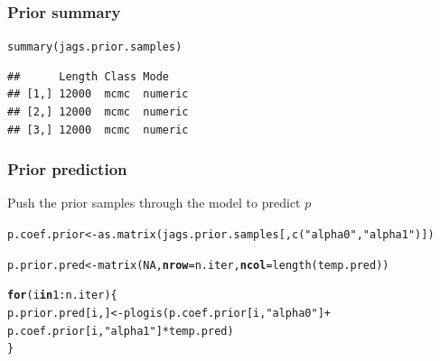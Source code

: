\documentclass[color=usenames,dvipsnames]{beamer}\usepackage[]{graphicx}\usepackage[]{xcolor}
\makeatletter
\newcommand{\hlnum}[1]{\textcolor[rgb]{0.69,0.494,0}{#1}}%
\newcommand{\hlsng}[1]{\textcolor[rgb]{0.749,0.012,0.012}{#1}}%
\newcommand{\hlopt}[1]{\textcolor[rgb]{0,0,0}{#1}}%
\newcommand{\hldef}[1]{\textcolor[rgb]{0,0,0}{#1}}%
\newcommand{\hlkwa}[1]{\textcolor[rgb]{0,0,0}{\textbf{#1}}}%
\newcommand{\hlkwb}[1]{\textcolor[rgb]{0,0.341,0.682}{#1}}%
\newcommand{\hlkwc}[1]{\textcolor[rgb]{0,0,0}{\textbf{#1}}}%
\newcommand{\hlkwd}[1]{\textcolor[rgb]{0.004,0.004,0.506}{#1}}%
\newenvironment{kframe}{%
 \def\at@end@of@kframe{}%
 \ifinner\ifhmode%
  \def\at@end@of@kframe{\end{minipage}}%
  \begin{minipage}{\columnwidth}%
 \fi\fi%
 \def\FrameCommand##1{\hskip\@totalleftmargin \hskip-\fboxsep
 \colorbox{shadecolor}{##1}\hskip-\fboxsep
     \hskip-\linewidth \hskip-\@totalleftmargin \hskip\columnwidth}%
 \MakeFramed {\advance\hsize-\width
   \@totalleftmargin\z@ \linewidth\hsize
   \@setminipage}}%
 {\par\unskip\endMakeFramed%
 \at@end@of@kframe}
\newenvironment{knitrout}{}{} %
\makeatother
\begin{document}
\begin{frame}[fragile]
  \frametitle{Prior summary}
\begin{knitrout}\tiny
{}\color{fgcolor}\begin{kframe}
\begin{alltt}
\hlkwd{summary}\hldef{(jags.prior.samples)}
\end{alltt}
\begin{verbatim}
##      Length Class Mode   
## [1,] 12000  mcmc  numeric
## [2,] 12000  mcmc  numeric
## [3,] 12000  mcmc  numeric
\end{verbatim}
\end{kframe}
\end{knitrout}
\end{frame}






\begin{frame}[fragile]
  \frametitle{Prior prediction}
  \small
  Push the prior samples through the model to predict $p$
\begin{knitrout}\scriptsize
{}\color{fgcolor}\begin{kframe}
\begin{alltt}
\hldef{p.coef.prior} \hlkwb{<-} \hlkwd{as.matrix}\hldef{(jags.prior.samples[,}\hlkwd{c}\hldef{(}\hlsng{"alpha0"}\hldef{,}\hlsng{"alpha1"}\hldef{)])}
\end{alltt}


{\ttfamily\noindent\bfseries{}}\begin{alltt}
\hldef{p.prior.pred} \hlkwb{<-} \hlkwd{matrix}\hldef{(}\hlnum{NA}\hldef{,} \hlkwc{nrow}\hldef{=n.iter,} \hlkwc{ncol}\hldef{=}\hlkwd{length}\hldef{(temp.pred))}
\end{alltt}


{\ttfamily\noindent\bfseries\color{errorcolor}{\#\# Error: object 'n.iter' not found}}\begin{alltt}
\hlkwa{for}\hldef{(i} \hlkwa{in} \hlnum{1}\hlopt{:}\hldef{n.iter) \{}
    \hldef{p.prior.pred[i,]} \hlkwb{<-} \hlkwd{plogis}\hldef{(p.coef.prior[i,}\hlsng{"alpha0"}\hldef{]} \hlopt{+}
                               \hldef{p.coef.prior[i,}\hlsng{"alpha1"}\hldef{]}\hlopt{*}\hldef{temp.pred)}
\hldef{\}}
\end{alltt}


{\ttfamily\noindent\bfseries\color{errorcolor}{\#\# Error: object 'n.iter' not found}}\end{kframe}
\end{knitrout}
\end{frame}
\end{document}
